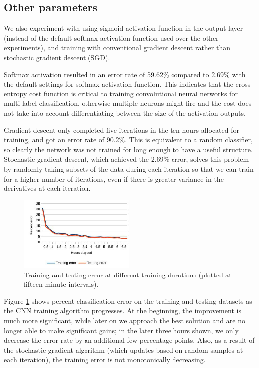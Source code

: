 \documentclass[10pt,twocolumn]{article}
\begin{document}
\subsection{Other parameters}

We also experiment with using sigmoid activation function in the output layer (instead of the default softmax activation function used over the other experiments), and training with conventional gradient descent rather than stochastic gradient descent (SGD).

Softmax activation resulted in an error rate of 59.62\% compared to 2.69\% with the default settings for softmax activation function. This indicates that the cross-entropy cost function is critical to training convolutional neural networks for multi-label classification, otherwise multiple neurons might fire and the cost does not take into account differentiating between the size of the activation outputs.

Gradient descent only completed five iterations in the ten hours allocated for training, and got an error rate of 90.2\%. This is equivalent to a random classifier, so clearly the network was not trained for long enough to have a useful structure. Stochastic gradient descent, which achieved the 2.69\% error, solves this problem by randomly taking subsets of the data during each iteration so that we can train for a higher number of iterations, even if there is greater variance in the derivatives at each iteration.

\begin{figure}
\centering
\includegraphics[width = 0.5\textwidth]{figure/error_over_time}
\caption{Training and testing error at different training durations (plotted at fifteen minute intervals).}
\label{fig:error_over_time}
\end{figure}

Figure \ref{fig:error_over_time} shows percent classification error on the training and testing datasets as the CNN training algorithm progresses. At the beginning, the improvement is much more significant, while later on we approach the best solution and are no longer able to make significant gains; in the later three hours shown, we only decrease the error rate by an additional few percentage points. Also, as a result of the stochastic gradient algorithm (which updates based on random samples at each iteration), the training error is not monotonically decreasing.
\end{document}
